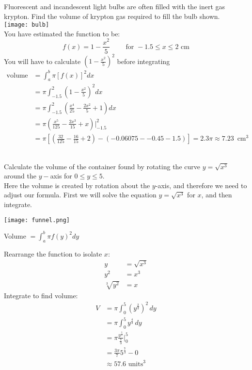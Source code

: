 \example Fluorescent and incandescent light bulbs are often filled with the inert gas krypton. Find the volume of krypton gas required to fill the bulb shown.\vspace{0.4cm}\\ 
\texttt{[image: bulb]}\\
You have estimated the function to be:\\
\[f(x)=1-\frac{x^2}{5}\qquad\text{ for } -1.5\leq x \leq 2\text{ cm}\] 
\solution You will have to calculate $\left(1-\frac{x^2}{5}\right)^2$ before integrating\\
	\begin{align*}
	\text{volume}&=\int_{a}^{b}\pi[f(x)]^2 dx\\
	&=\pi\int_{-1.5}^{2}\left(1-\frac{x^2}{5}\right)^2 dx\\
	&=\pi\int_{-1.5}^{2}\left(\frac{x^4}{25}-\frac{2x^2}{5}+1\right)dx\\
	&=\pi\left(\frac{x^5}{125}-\frac{2x^3}{15}+x\right)  \Bigg|_{-1.5}^2\\
	&=\pi\left[\left(\frac{32}{125}-\frac{16}{15}+2\right)-\left(-0.06075--0.45-1.5\right)\right]=2.3\pi\approx 7.23\, \text{ cm}^3\end{align*}
\\	
\begin{multicols}{2}
\examq Calculate the volume of the container found by rotating the curve $y=\sqrt{x^3}$ around the $y-$axis for $0\leq y \leq 5$.\\

Here the volume is created by rotation about the $y$-axis, and therefore we need to adjust our formula. First we will solve the equation $y=\sqrt{x^3}$ for $x$, and then integrate.
\columnbreak
\begin{center}
		\texttt{[image: funnel.png]}
\end{center}
\end{multicols}

\solution Volume $=\int_{a}^{b} \pi f(y)^2 dy$\\
\begin{multicols}{2}
Rearrange the function to isolate $x$:
	\begin{align*}
	y&=\sqrt{x^3}\\
	y^2&=x^3\\
	\sqrt[3]{y^2}&=x\end{align*}
Integrate to find volume:\\
	\begin{align*}V&=\pi\int_{0}^{5} (y^{\frac{2}{3}})^2\,dy\\
	&=\pi\int_{0}^{5} y^{\frac{4}{3}}\,dy\\
	&=\pi\frac{y^{\frac{7}{3}}}{\frac{7}{3}}\bigg\vert_{0}^{5}\\
	&=\frac{3\pi}{7}5^{\frac{7}{3}}-0\\
	&\approx 57.6 \,\,\mathrm{units}^3
	\end{align*}
\end{multicols}

